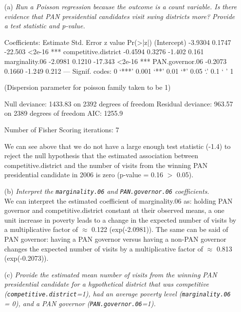 \documentclass[12pt,letterpaper]{article}
\begin{document}
\begin{enumerate}
	\item [(a)]
	\emph{Run a Poisson regression because the outcome is a count variable. Is there evidence that PAN presidential candidates visit swing districts more? Provide a test statistic and p-value.}
	
	  
	
	\begin{verbnobox}[\footnotesize]
		Coefficients:
		Estimate Std. Error z value Pr(>|z|)    
		(Intercept)           -3.9304     0.1747 -22.503   <2e-16 ***
		competitive.district  -0.4594     0.3276  -1.402    0.161    
		marginality.06        -2.0981     0.1210 -17.343   <2e-16 ***
		PAN.governor.06       -0.2073     0.1660  -1.249    0.212    
		---
		Signif. codes:  0 ‘***’ 0.001 ‘**’ 0.01 ‘*’ 0.05 ‘.’ 0.1 ‘ ’ 1
		
		(Dispersion parameter for poisson family taken to be 1)
		
		Null deviance: 1433.83  on 2392  degrees of freedom
		Residual deviance:  963.57  on 2389  degrees of freedom
		AIC: 1255.9
		
		Number of Fisher Scoring iterations: 7
	\end{verbnobox}			
	
	We can see above that we do not have a large enough test statistic (-1.4) to reject the null hypothesis that the estimated association between competitive.district and the number of visits from the winning PAN presidential candidate in 2006 is zero (p-value = 0.16 $>$ 0.05).\\
	
	\item [(b)]
	\emph{Interpret the \texttt{marginality.06} and \texttt{PAN.governor.06} coefficients.}\\
	
	We can interpret the estimated coefficient of marginality.06 as: holding PAN governor and competitive.district constant at their observed means, a one unit increase in poverty leads to a change in the expected number of visits by a multiplicative factor of $\approx$ 0.122 (exp(-2.0981)). The same can be said of PAN governor: having a PAN governor versus having a non-PAN governor changes the expected number of visits by a multiplicative factor of $\approx$ 0.813 (exp(-0.2073)).\\
	
	\item [(c)]
	\emph{Provide the estimated mean number of visits from the winning PAN presidential candidate for a hypothetical district that was competitive (\texttt{competitive.district}=1), had an average poverty level (\texttt{marginality.06} = 0), and a PAN governor (\texttt{PAN.governor.06}=1).}\\
	

\end{enumerate}
\end{document}
